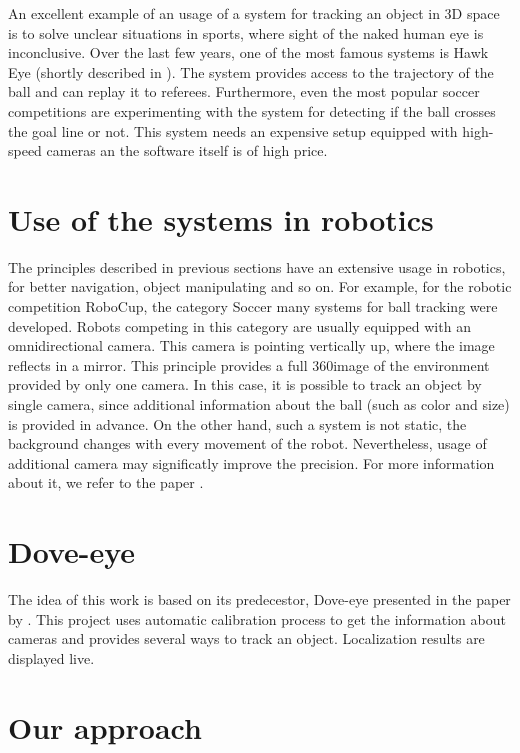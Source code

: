 An excellent example of an usage of a system for tracking an object in 3D space
is to solve unclear situations in sports, where sight of the naked human
eye is inconclusive. Over the last few years, one of the most famous systems is
Hawk Eye (shortly described in \citet*{owens2003hawk}). The system provides
access to the trajectory of the ball and can replay it to referees.
Furthermore, even the most popular soccer competitions are experimenting with
the system for detecting if the ball crosses the goal line or not.  This system needs
an expensive setup equipped with high-speed cameras an the software itself is of
high price.

\section{Use of the systems in robotics}

The principles described in previous sections have an extensive usage in
robotics, for better navigation, object manipulating and so on. For example,
for the robotic competition
RoboCup, the category Soccer many systems for ball tracking were developed. Robots
competing in this category are usually equipped with an omnidirectional camera.
This camera is pointing vertically up, where the image reflects in a mirror.
This principle provides a full 360\degree image of the environment provided by
only one camera. In this case, it is possible to track an object by single
camera, since additional information about the ball (such as color and size)
is provided in advance. On the other hand, such a system is not static, the
background changes with every movement of the robot. Nevertheless, usage of
additional camera may significatly improve the precision. For more information
about it, we refer to the paper \citet*{kappeler20103d}.


\section{Dove-eye}

The idea of this work is based on its predecestor, Dove-eye presented in the
paper by \citet*{dove-eye}. This project uses automatic calibration process to
get the information about cameras and provides several ways to track an
object. Localization results are displayed live.

\section{Our approach}


